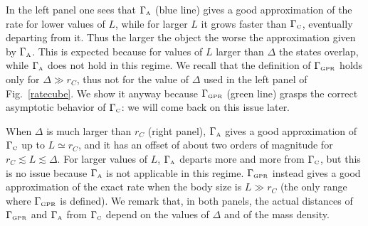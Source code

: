 \documentclass[11pt,onecolumn,amssymb,nofootinbib]{revtex4}
\begin{document}
In the left panel one sees that $\Gamma_\text{\tiny{A}}$ (blue line) gives a good approximation of the rate for lower values of $L$, while for larger $L$ it grows faster than $\Gamma_\text{\tiny{C}}$, eventually departing from it. Thus the larger the object the worse the approximation given by $\Gamma_\text{\tiny{A}}$. This is expected because for values of $L$ larger than $\Delta$ the states overlap, while $\Gamma_\text{\tiny{A}}$ does not hold in this regime.  We recall that the definition of $\Gamma_\text{\tiny{GPR}}$ holds only for $\Delta\gg r_C$, thus not for the value of $\Delta$ used in the left panel of Fig.~\ref{ratecube}. We show it anyway because $\Gamma_\text{\tiny{GPR}}$ (green line) grasps the correct asymptotic behavior of $\Gamma_\text{\tiny{C}}$: we will come back on this issue later. 

When $\Delta$ is much larger than $r_C$ (right panel), $\Gamma_\text{\tiny{A}}$ gives a good approximation of $\Gamma_\text{\tiny{C}}$ up to $L\simeq r_C$, and it has an offset of about two orders of magnitude for $r_C\lesssim L\lesssim \Delta$. For larger values of $L$, $\Gamma_\text{\tiny{A}}$ departs more and more from $\Gamma_\text{\tiny{C}}$, but this is no issue because $\Gamma_\text{\tiny{A}}$ is not applicable in this regime. $\Gamma_\text{\tiny{GPR}}$ instead gives a good approximation of the exact rate when the body size is $L\gg r_C$ (the only range where $\Gamma_\text{\tiny{GPR}}$ is defined). %
We remark that, in both panels, the actual distances of $\Gamma_\text{\tiny{GPR}}$ and $\Gamma_\text{\tiny{A}}$ from $\Gamma_\text{\tiny{C}}$ depend on the values of $\Delta$ and of the mass density.
\end{document}
